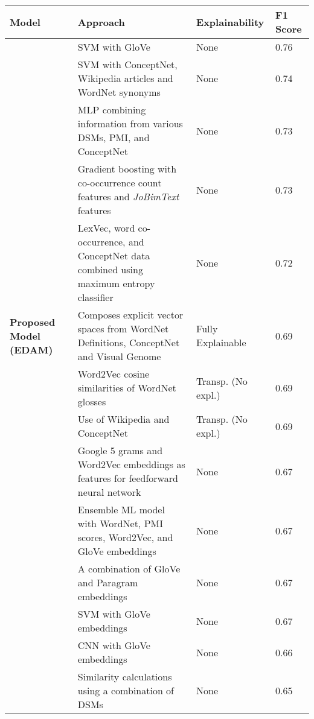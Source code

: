 \documentclass[11pt,a4paper]{article}
\begin{document}
\begin{table*}
	\scriptsize
	
    \centering
    \begin{center}
        \begin{tabularx}{\textwidth}{ |p{}|p{}|p{}|p{}| }
        \hline
            \textbf{Model} & \textbf{Approach} & \textbf{Explainability} & \textbf{F1 Score} \\
            \hline
            \cite{sunnynlp}&SVM with GloVe&None&0.76\\
            \hline
            \cite{luminoso}&SVM with ConceptNet, Wikipedia articles and WordNet synonyms&None&0.74\\
            \hline
            \cite{ntunlp}&MLP combining information from various DSMs, PMI, and ConceptNet&None&0.73\\
            \hline
            \cite{bomji}&Gradient boosting with co-occurrence count features and \textit{JoBimText} features&None&0.73\\
            \hline
            \cite{uwb}&LexVec, word co-occurrence, and ConceptNet data combined using maximum entropy classifier&None& 0.72\\
            \hline
            \textbf{Proposed Model (EDAM)} & Composes explicit vector spaces from WordNet Definitions, ConceptNet and Visual Genome  & Fully Explainable & 0.69\\
            \hline
            \cite{meaningspace}&Word2Vec cosine similarities of WordNet glosses& Transp. (No expl.) & 0.69\\
            \hline
            \cite{elirfupv}&Use of Wikipedia and ConceptNet& Transp. (No expl.) &0.69\\
            \hline
            \cite{ghh}&Google 5 grams and Word2Vec embeddings as features for feedforward neural network&None&0.67\\
            \hline
            \cite{ecnu}&Ensemble ML model with WordNet, PMI scores, Word2Vec, and GloVe embeddings&None&0.67\\
            \hline
            \cite{discriminator}&A combination of GloVe and Paragram embeddings&None&0.67\\
            \hline
            \cite{umd}&SVM with GloVe embeddings&None&0.67\\
            \hline
            \cite{amritanlp}&CNN with GloVe embeddings&None&0.66\\
            \hline
            \cite{igevorse}&Similarity calculations using a combination of DSMs&None&0.65\\

\end{tabularx}
\end{center}
\end{table*}
\end{document}
